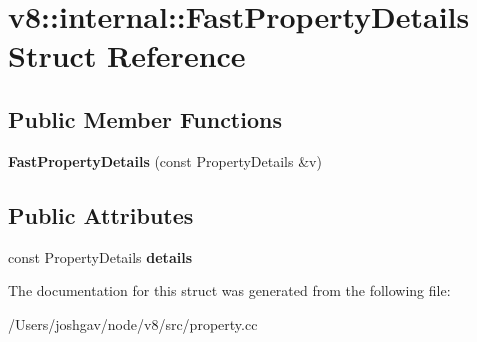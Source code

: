 \hypertarget{structv8_1_1internal_1_1_fast_property_details}{}\section{v8\+:\+:internal\+:\+:Fast\+Property\+Details Struct Reference}
\label{structv8_1_1internal_1_1_fast_property_details}
\subsection*{Public Member Functions}
\begin{DoxyCompactItemize}
\item 
{\bfseries Fast\+Property\+Details} (const Property\+Details \&v)\hypertarget{structv8_1_1internal_1_1_fast_property_details_a51327b6c8e04a235f89eba137dc70314}{}\label{structv8_1_1internal_1_1_fast_property_details_a51327b6c8e04a235f89eba137dc70314}

\end{DoxyCompactItemize}
\subsection*{Public Attributes}
\begin{DoxyCompactItemize}
\item 
const Property\+Details {\bfseries details}\hypertarget{structv8_1_1internal_1_1_fast_property_details_a8daf5716125b329c12a0aa46bff740f2}{}\label{structv8_1_1internal_1_1_fast_property_details_a8daf5716125b329c12a0aa46bff740f2}

\end{DoxyCompactItemize}


The documentation for this struct was generated from the following file\+:\begin{DoxyCompactItemize}
\item 
/\+Users/joshgav/node/v8/src/property.\+cc\end{DoxyCompactItemize}
